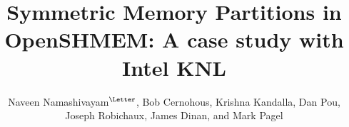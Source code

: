 \documentclass[runningheads,a4paper]{llncs}
\begin{document}
\mainmatter
\title{Symmetric Memory Partitions in OpenSHMEM: A case study with Intel KNL}
\author{Naveen Namashivayam\affmark[1]$^{\textrm{\Letter}}$,
        Bob Cernohous\affmark[1],
        Krishna Kandalla\affmark[1],
        Dan Pou\affmark[1],
        Joseph Robichaux\affmark[2],
        James Dinan\affmark[2],
        and Mark Pagel\affmark[1]}


\maketitle
\begin{abstract}

\end{abstract}














\end{document}
